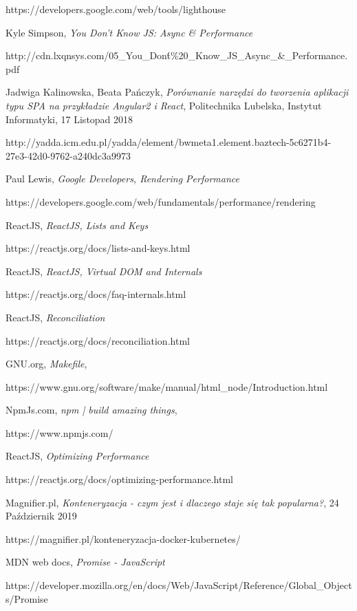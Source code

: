 \begin{thebibliography}{99}
https://developers.google.com/web/tools/lighthouse

Kyle Simpson,
\textit{You Don't Know JS: Async \& Performance}

http://cdn.lxqnsys.com/05\_You\_Don\'t\%20\_Know\_JS\_Async\_\&\_Performance.pdf

Jadwiga Kalinowska, Beata Pańczyk,
\textit{Porównanie narzędzi do tworzenia aplikacji typu SPA na przykładzie Angular2 i React},
Politechnika Lubelska, Instytut Informatyki,
17 Listopad 2018

http://yadda.icm.edu.pl/yadda/element/bwmeta1.element.baztech-5c6271b4-27e3-42d0-9762-a240dc3a9973

Paul Lewis,
\textit{Google Developers, Rendering Performance}

https://developers.google.com/web/fundamentals/performance/rendering

ReactJS,
\textit{ReactJS,  Lists and Keys}

https://reactjs.org/docs/lists-and-keys.html

ReactJS,
\textit{ReactJS, Virtual DOM and Internals}

https://reactjs.org/docs/faq-internals.html

ReactJS,
\textit{Reconciliation}

https://reactjs.org/docs/reconciliation.html

GNU.org, 
\textit{Makefile},

https://www.gnu.org/software/make/manual/html\_node/Introduction.html

NpmJs.com,
\textit{npm | build amazing things},

https://www.npmjs.com/

ReactJS,
\textit{Optimizing Performance}

https://reactjs.org/docs/optimizing-performance.html

Magnifier.pl,
\textit{Konteneryzacja - czym jest i dlaczego staje się tak popularna?},
24 Październik 2019

https://magnifier.pl/konteneryzacja-docker-kubernetes/

MDN web docs,
\textit{Promise - JavaScript}

https://developer.mozilla.org/en/docs/Web/JavaScript/Reference/Global\_Objects/Promise


\end{thebibliography}

